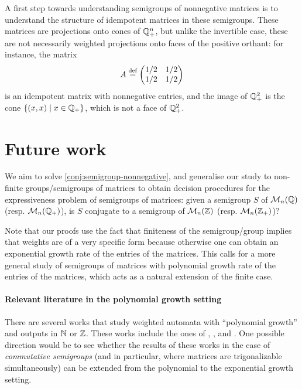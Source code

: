 \begin{remark}
  \label{rem:projections}
  A first step towards understanding semigroups of nonnegative matrices
  is to understand the structure of idempotent matrices in these semigroups.
  These matrices are projections onto cones of $\Rat_+^n$, but unlike 
  the invertible case, these are not necessarily weighted 
  projections onto faces of the positive orthant: for instance, the matrix 
  \begin{equation*}
    A \defined \begin{pmatrix}
      1/2 & 1/2 \\
      1/2 & 1/2
    \end{pmatrix}
  \end{equation*}
  is an idempotent matrix with nonnegative entries, and the image of $\Rat_+^2$ is the
  cone $\{(x, x) \mid x \in \Rat_+\}$, which is not a face of $\Rat_+^2$.
\end{remark}



\section{Future work}

We aim to solve \cref{conj:semigroup-nonnegative}, and generalise our study to
non-finite groups/semigroups of matrices to obtain decision procedures for the
expressiveness problem of semigroups of matrices: given a semigroup $S$ of
$\Mat[n]{\Rat}$ (resp. $\Mat[n]{\Rat_+}$), is $S$ conjugate to a semigroup of
$\Mat[n]{\Int}$ (resp. $\Mat[n]{\Int_+}$)?

Note that our proofs use the fact that finiteness of the semigroup/group
implies that weights are of a very specific form because otherwise one can
obtain an exponential growth rate of the entries of the matrices. This calls
for a more general study of semigroups of matrices with polynomial growth rate
of the entries of the matrices, which acts as a natural extension of the
finite case.



\paragraph*{Relevant literature in the polynomial growth setting} There are
several works that study weighted automata with ``polynomial growth'' and
outputs in $\Nat$ or $\Int$. These works include the ones of \cite{KRRC13},
\cite{CDTL23}, and \cite{LOPEZ25}. One possible direction would be to see
whether the results of these works in the case of \emph{commutative semigroups}
(and in particular, where matrices are trigonalizable simultaneously) can be
extended from the polynomial to the exponential growth setting.


